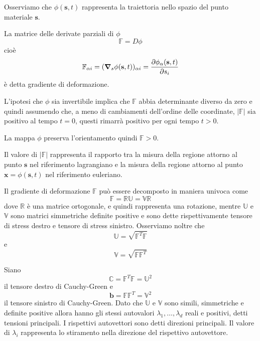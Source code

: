 Osserviamo che $\phi(\mathbf{s},t)$ rappresenta la traiettoria nello spazio del punto materiale $\mathbf{s}$.

La matrice delle derivate parziali di $\phi$ 
\begin{equation*}
\mathbb{F} = D\phi
\end{equation*}
cioè
\begin{equation*}  
\mathbb{F}_{\alpha i} = (\boldsymbol{\nabla}_{s}\phi(\mathbf{s},t))_{\alpha i} = \frac{\partial \phi_{\alpha}(\mathbf{s},t)}{\partial s_{i}}
\end{equation*}
è detta gradiente di deformazione.

L'ipotesi che $\phi$ sia invertibile implica che $\mathbb{F}$ abbia determinante diverso da zero e quindi assumendo che, a meno di cambiamenti dell'ordine delle coordinate, $\vert\mathbb{F}\vert$ sia positivo al tempo $t=0$, questi rimarrà positivo per ogni tempo $t>0$.

La mappa $\phi$ preserva l'orientamento quindi $\mathbb{F}>0$. 

Il valore di $|\mathbb{F}|$ rappresenta il rapporto tra la misura della regione attorno al punto $\mathbf{s}$ nel riferimento lagrangiano e la misura della regione attorno al punto $\mathbf{x} = \phi(\mathbf{s},t)$ nel riferimento euleriano.

Il gradiente di deformazione $\mathbb{F}$ può essere decomposto in maniera univoca come 
\begin{equation*}
\mathbb{F}=\mathbb{R}\mathbb{U}=\mathbb{V}\mathbb{R}
\end{equation*}
dove $\mathbb{R}$ è una matrice ortogonale, e quindi rappresenta una rotazione, mentre $\mathbb{U}$ e $\mathbb{V}$ sono matrici simmetriche definite positive e sono dette rispettivamente tensore di stress destro e tensore di stress sinistro. 
Osserviamo noltre che 
\begin{equation*}
\mathbb{U}=\sqrt{\mathbb{F}^T\mathbb{F}}
\end{equation*}
e
\begin{equation*}
\mathbb{V}=\sqrt{\mathbb{F}\mathbb{F}^T}
\end{equation*}

Siano
\begin{equation*}
\mathbb{C}=\mathbb{F}^T\mathbb{F}=\mathbb{U}^2
\end{equation*}
il tensore destro di Cauchy-Green e
\begin{equation*}
\mathbf{b}=\mathbb{F}\mathbb{F}^T=\mathbb{V}^2
\end{equation*}
il tensore sinistro di Cauchy-Green.
Dato che $\mathbb{U}$ e $\mathbb{V}$ sono simili, simmetriche e definite positive allora hanno gli stessi autovalori $\lambda_1,\dots,\lambda_{d}$ reali e positivi, detti tensioni principali. I rispettivi autovettori sono detti direzioni principali. Il valore di $\lambda_i$ rappresenta lo stiramento nella direzione del rispettivo autovettore.

